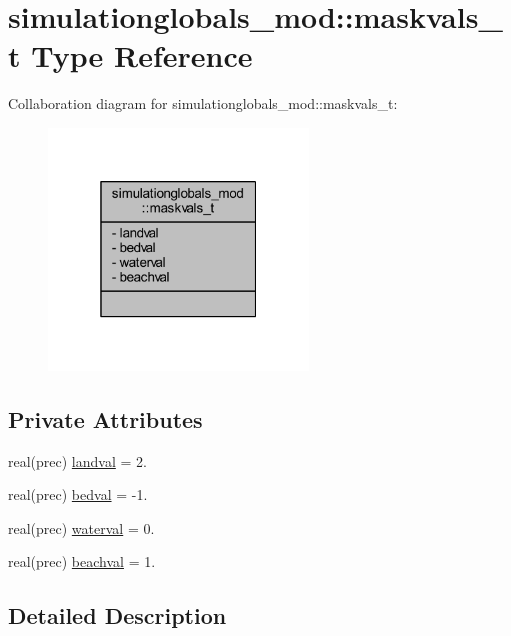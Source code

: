 \hypertarget{structsimulationglobals__mod_1_1maskvals__t}{}\section{simulationglobals\+\_\+mod\+:\+:maskvals\+\_\+t Type Reference}
\label{structsimulationglobals__mod_1_1maskvals__t}


Collaboration diagram for simulationglobals\+\_\+mod\+:\+:maskvals\+\_\+t\+:\nopagebreak
\begin{figure}[H]
\begin{center}
\leavevmode
\includegraphics[width=196pt]{structsimulationglobals__mod_1_1maskvals__t__coll__graph}
\end{center}
\end{figure}
\subsection*{Private Attributes}
\begin{DoxyCompactItemize}
\item 
real(prec) \mbox{\hyperlink{structsimulationglobals__mod_1_1maskvals__t_a6b8266db0422df028f6a2abe90382fcf}{landval}} = 2.
\item 
real(prec) \mbox{\hyperlink{structsimulationglobals__mod_1_1maskvals__t_a300c996800a60fde8b960454efa5250b}{bedval}} = -\/1.
\item 
real(prec) \mbox{\hyperlink{structsimulationglobals__mod_1_1maskvals__t_ad37aae6fd7454ee653511020ad79f539}{waterval}} = 0.
\item 
real(prec) \mbox{\hyperlink{structsimulationglobals__mod_1_1maskvals__t_a68a1cb8107af729c423523b42da036e0}{beachval}} = 1.
\end{DoxyCompactItemize}


\subsection{Detailed Description}


